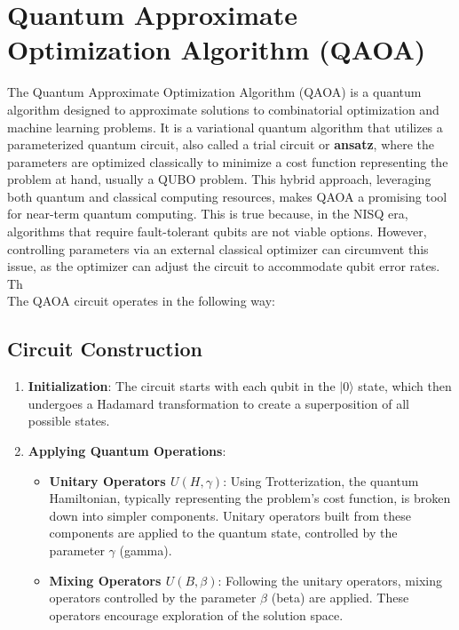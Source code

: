\documentclass[12pt,a4paper]{report}
\begin{document}
\newpage
\section{Quantum Approximate Optimization Algorithm (QAOA)}

\noindent
The Quantum Approximate Optimization Algorithm (QAOA) is a quantum algorithm designed to approximate solutions to combinatorial optimization and machine learning problems. It is a variational quantum algorithm that utilizes a parameterized quantum circuit, also called a trial circuit or \textbf{ansatz}, where the parameters are optimized classically to minimize a cost function representing the problem at hand, usually a QUBO problem. This hybrid approach, leveraging both quantum and classical computing resources, makes QAOA a promising tool for near-term quantum computing. This is true because, in the NISQ era, algorithms that require fault-tolerant qubits are not viable options. However, controlling parameters via an external classical optimizer can circumvent this issue, as the optimizer can adjust the circuit to accommodate qubit error rates. Th 
\\

\noindent
The QAOA circuit operates in the following way:

\subsection*{Circuit Construction}

\begin{enumerate}
    \item \textbf{Initialization}: The circuit starts with each qubit in the \( |0\rangle \) state, which then undergoes a Hadamard transformation to create a superposition of all possible states.

    \item \textbf{Applying Quantum Operations}:
    \begin{itemize}
        \item \textbf{Unitary Operators \( U(H, \gamma) \)}: Using Trotterization, the quantum Hamiltonian, typically representing the problem’s cost function, is broken down into simpler components. Unitary operators built from these components are applied to the quantum state, controlled by the parameter \( \gamma \) (gamma).
        \item \textbf{Mixing Operators \( U(B, \beta) \)}: Following the unitary operators, mixing operators controlled by the parameter \( \beta \) (beta) are applied. These operators encourage exploration of the solution space.
    \end{itemize}

\end{enumerate}
\end{document}

